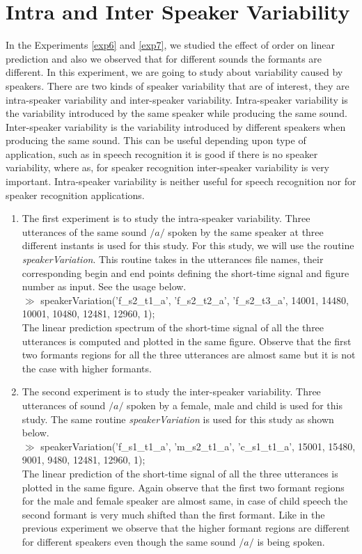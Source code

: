 \section{Intra and Inter Speaker Variability}
\label{exp8}
In the Experiments \ref{exp6} and \ref{exp7}, we studied the effect of
order on linear prediction and also we observed that for different
sounds the formants are different. In this experiment, we are going to
study about 
variability caused by speakers. There are two kinds of speaker
variability that are of interest, they are intra-speaker variability
and inter-speaker variability. Intra-speaker variability is the
variability introduced by the same speaker while producing the same
sound. Inter-speaker variability is the variability introduced by
different speakers when producing the same sound. This can be useful
depending upon type of application, such as in speech recognition it is
good if there is no speaker variability, where as, for speaker
recognition inter-speaker variability is very important. Intra-speaker
variability is neither useful for speech recognition nor for
speaker recognition applications.
\begin{enumerate}

	\item The first experiment is to study the intra-speaker
variability. Three 
utterances of the same sound $/a/$ spoken by the same speaker at three
different instants is used for this study. For this study, we will use
the routine {\it speakerVariation}. This routine takes in the
utterances file names, their corresponding begin and end points defining
the short-time signal and figure number as input. See the usage
below.\\[2ex] 
$\gg$ speakerVariation('f\_s2\_t1\_a', 'f\_s2\_t2\_a', 'f\_s2\_t3\_a',
14001, 14480, 10001, 10480, 12481, 12960, 1);\\[2ex]
The linear prediction spectrum of the short-time signal of all the
three utterances is computed and plotted in the same figure. Observe
that the first two formants regions for all the three utterances are
almost same but it is not the case with higher formants.
	\item The second experiment is to study the inter-speaker
variability. Three utterances of sound $/a/$ spoken by a female, male
and child is used for this study. The same routine {\it
speakerVariation} is used for this study as shown below.\\[2ex]
$\gg$ speakerVariation('f\_s1\_t1\_a', 'm\_s2\_t1\_a', 'c\_s1\_t1\_a', 15001,
15480, 9001, 9480, 12481, 12960, 1);\\[2ex]
The linear prediction of the short-time signal of all the three
utterances is plotted in the same figure. Again observe that the first
two formant regions for the male and female speaker are almost same,
in case of child speech the second formant is very much shifted than
the first formant. Like in the previous experiment we observe that the
higher formant regions are different for different speakers even
though the same sound $/a/$ is being spoken.
\end{enumerate}

